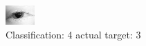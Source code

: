 \begin{figure}[h!]
\begin{center}
\includegraphics[width=0.60\columnwidth]{figures/ID142_class_4_target_3.png}
\end{center}
\caption{ Classification: 4 actual target: 3}
\label{fig:ID142_class_4_target_3}
\end{figure}
